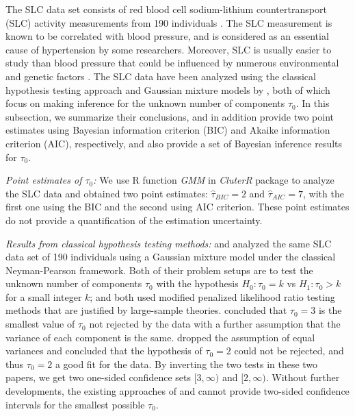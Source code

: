 \documentclass[12pt]{article}
\theoremstyle{shortspace}
\begin{document}
The SLC data set consists of red blood cell sodium-lithium countertransport (SLC) activity measurements from 190 individuals \citep{dudley_assessing_1991}. 
The SLC measurement is known to be correlated with blood pressure, and  is considered as an essential cause of hypertension by some researchers. 
Moreover, SLC is usually easier to study than blood pressure that could be influenced by numerous environmental and genetic factors  \citep{dudley_assessing_1991}.
The SLC data have been analyzed using the classical hypothesis testing approach and Gaussian mixture models by \citep{chen_inference_2012, roeder_graphical_1994}, both of which focus on making inference for the unknown number of components $\tau_0$. In this subsection, we summarize their conclusions, and in addition provide two point estimates using Bayesian information criterion (BIC) and  Akaike information criterion (AIC),  respectively, and also provide a set of Bayesian inference results for $\tau_0$.


{\it Point estimates of $\tau_0$:}  We use R function {\it GMM} in {\it CluterR} package to analyze the SLC data and obtained two point estimates: $\hat \tau_{BIC} = 2$ and $\hat \tau_{AIC}  = 7$, with the first one using the BIC and the second using AIC criterion.
These point estimates do not provide a quantification of the estimation uncertainty.  


{\it Results from classical hypothesis testing methods:}  
\cite{roeder_graphical_1994} and \cite{chen_inference_2012} analyzed the same SLC data set 
of 190 individuals using a Gaussian mixture model 
under the classical Neyman-Pearson framework. Both of their problem setups are to test the unknown number of components $\tau_0$ with the hypothesis $H_0: \tau_0 = k$ vs $H_1: \tau_0>k$ for a small integer $k$; and both used modified penalized likelihood ratio testing methods that are justified by large-sample theories. 
\cite{roeder_graphical_1994} concluded that $\tau_0=3$ is the smallest value of $\tau_0$ not rejected by the data with a further assumption that the variance of each component is 
the same.  
\cite{chen_inference_2012} dropped the assumption of equal variances and 
concluded that the hypothesis of $\tau_0=2$ could not be rejected, 
and thus $\tau_0=2$ a good fit for the data. By inverting the two tests in these two papers, we get two one-sided confidence sets $[3, \infty)$ and  $[2, \infty)$. Without further developments, the existing approaches of \cite{roeder_graphical_1994} and \cite{chen_inference_2012} cannot provide two-sided confidence intervals for the smallest possible $\tau_0$.  
\end{document}

